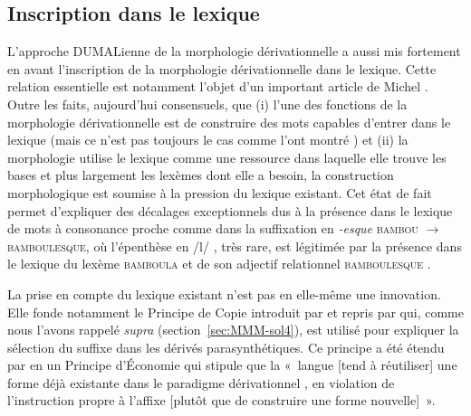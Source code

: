 \documentclass[output=paper]{langsci/langscibook}
\begin{document}
\subsection{Inscription dans le lexique}
\label{sec:inscription-lexique}

L'approche DUMALienne de la morphologie dérivationnelle \citep{roche2011.dumal} a aussi mis fortement  en avant l'inscription de la morphologie dérivationnelle dans le lexique.  Cette relation essentielle est notamment l'objet d'un important article de Michel \cite{roche2009.bslp}.   Outre les faits, aujourd'hui consensuels, que (i) l'une des fonctions de la morphologie dérivationnelle est de construire des mots capables d'entrer dans le lexique (mais ce n'est pas toujours le cas comme l'ont montré \citet{DalGeorgette2016}) et (ii) la morphologie utilise le lexique comme une ressource dans laquelle elle trouve les bases et plus largement les lexèmes dont elle a besoin, la construction morphologique est soumise à la pression  du lexique existant.  Cet état de fait permet d'expliquer des décalages exceptionnels dus à la présence dans le lexique de mots à consonance proche  comme dans la suffixation en \emph{\mbox{-esque}}  \textsc{bambou} $\rightarrow$ \textsc{bamboulesque}, où l'épenthèse en /l/%
, très rare, est légitimée par la présence dans le lexique du lexème \textsc{bamboula} et de son adjectif relationnel \textsc{bamboulesque} \citep{plenat2009.mslp}.

La prise en compte du lexique existant n'est pas en elle-même une innovation.  Elle fonde notamment le Principe de Copie  introduit par \cite{Dell70} et repris par \cite{corbin1980.parasynthese,Corbin87} qui, comme nous l'avons rappelé \emph{supra} (section~\ref{sec:MMM-sol4}), est utilisé pour expliquer la sélection du suffixe dans les dérivés parasynthétiques.  Ce principe a été étendu par \cite{roche2007.isme-decembrettes} en un Principe d'Économie qui stipule que la  «~langue [tend à réutiliser] une forme déjà existante dans le paradigme dérivationnel
, en violation de l'instruction propre à l'affixe [plutôt que de construire une forme nouvelle]~».
\end{document}
